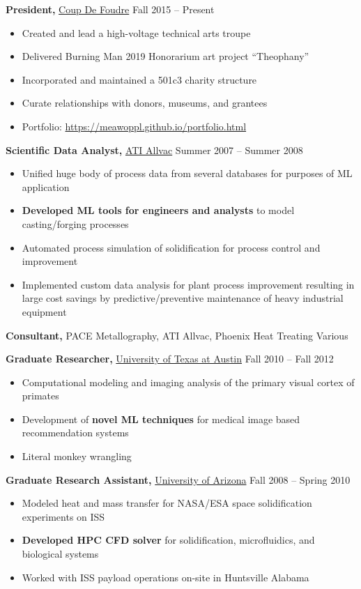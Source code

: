 \documentclass{res}
\begin{document}
\begin{resume}
{\bf President,}  \href{http://coupdefoud.re}{Coup De Foudre} \hfill   Fall 2015 -- Present
\begin{itemize} \itemsep -2pt
  \item Created and lead a high-voltage technical arts troupe
  \item Delivered Burning Man 2019 Honorarium art project ``Theophany''
  \item Incorporated and maintained a 501c3 charity structure
  \item Curate relationships with donors, museums, and grantees
  \item Portfolio: \href{https://meawoppl.github.io/portfolio.html}{https://meawoppl.github.io/portfolio.html}
\end{itemize}

{\bf Scientific Data Analyst,} \href{https://www.atimetals.com/}{ATI Allvac} \hfill
Summer 2007 -- Summer 2008
\begin{itemize} \itemsep -2pt
  \item Unified huge body of process data from several databases for purposes of ML application
  \item \textbf{Developed ML tools for engineers and analysts} to model casting/forging processes
  \item Automated process simulation of solidification for process control and improvement
  \item Implemented custom data analysis for plant process improvement resulting in large
        cost savings by predictive/preventive maintenance of heavy industrial equipment
\end{itemize}

{\bf Consultant,} PACE Metallography, ATI Allvac, Phoenix Heat Treating \hfill Various

{\bf Graduate Researcher,} \href{https://www.utexas.edu/}{University of Texas at Austin} \hfill
Fall 2010 -- Fall 2012
\begin{itemize} \itemsep -2pt
  \item Computational modeling and imaging analysis of the primary visual cortex of primates
  \item Development of \textbf{novel ML techniques} for medical image based recommendation systems
  \item Literal monkey wrangling
\end{itemize}

{\bf Graduate Research Assistant,} \href{https://www.arizona.edu/}{University of Arizona} \hfill
Fall 2008 -- Spring 2010
\begin{itemize} \itemsep -2pt
  \item Modeled heat and mass transfer for NASA/ESA space solidification experiments on ISS
  \item \textbf{Developed HPC CFD solver} for solidification, microfluidics, and biological systems
  \item Worked with ISS payload operations on-site in Huntsville Alabama 
\end{itemize}


\end{resume}
\end{document}
